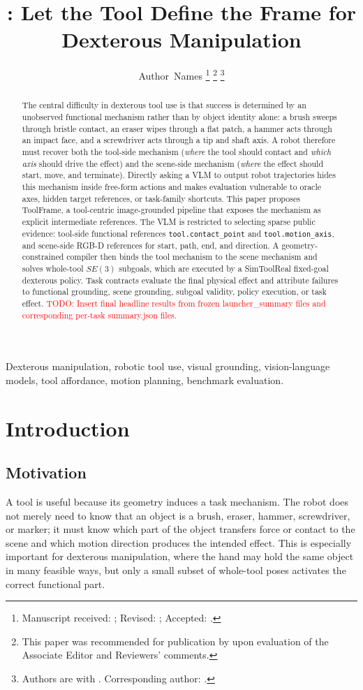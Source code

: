 \documentclass[journal]{IEEEtran}
\title{\method{}: Let the Tool Define the Frame for Dexterous Manipulation}
\author{Author~Names%
\thanks{Manuscript received: \todo{date}; Revised: \todo{date}; Accepted:
\todo{date}.}%
\thanks{This paper was recommended for publication by \todo{Editor} upon
evaluation of the Associate Editor and Reviewers' comments.}%
\thanks{Authors are with \todo{affiliation}. Corresponding author:
\todo{name/email}.}%
}
\newcommand{\todo}[1]{\textcolor{red}{TODO: #1}}
\newcommand{\method}{ToolFrame}
\begin{document}
\maketitle

\begin{abstract}
The central difficulty in dexterous tool use is that success is determined by
an unobserved functional mechanism rather than by object identity alone: a
brush sweeps through bristle contact, an eraser wipes through a flat patch, a
hammer acts through an impact face, and a screwdriver acts through a tip and
shaft axis. A robot therefore must recover both the tool-side mechanism
(\emph{where} the tool should contact and \emph{which axis} should drive the
effect) and the scene-side mechanism (\emph{where} the effect should start,
move, and terminate). Directly asking a VLM to output robot trajectories hides
this mechanism inside free-form actions and makes evaluation vulnerable to
oracle axes, hidden target references, or task-family shortcuts. This paper
proposes \method{}, a tool-centric image-grounded pipeline that exposes the
mechanism as explicit intermediate references. The VLM is restricted to
selecting sparse public evidence: tool-side functional references
\texttt{tool.contact\_point} and \texttt{tool.motion\_axis}, and scene-side
RGB-D references for start, path, end, and direction. A geometry-constrained
compiler then binds the tool mechanism to the scene mechanism and solves
whole-tool $SE(3)$ subgoals, which are executed by a SimToolReal fixed-goal
dexterous policy. Task contracts evaluate the final physical effect and
attribute failures to functional grounding, scene grounding, subgoal validity,
policy execution, or task effect. \todo{Insert final headline results from
frozen launcher\_summary files and corresponding per-task summary.json files.}
\end{abstract}

\begin{IEEEkeywords}
Dexterous manipulation, robotic tool use, visual grounding,
vision-language models, tool affordance, motion planning, benchmark evaluation.
\end{IEEEkeywords}

\section{Introduction}
\subsection{Motivation}
A tool is useful because its geometry induces a task mechanism. The robot does
not merely need to know that an object is a brush, eraser, hammer,
screwdriver, or marker; it must know which part of the object transfers force
or contact to the scene and which motion direction produces the intended
effect. This is especially important for dexterous manipulation, where the hand
may hold the same object in many feasible ways, but only a small subset of
whole-tool poses activates the correct functional part.
\end{document}
